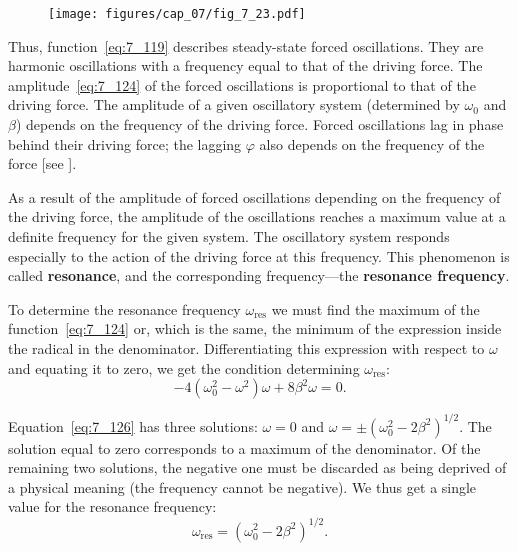 \begin{figure}[t]
	\begin{center}
		\texttt{[image: figures/cap\_07/fig\_7\_23.pdf]}
		\caption[]{}
		\label{fig:7_23}
	\end{center}
	\vspace{-0.8cm}
\end{figure}

Thus, function~\eqref{eq:7_119} describes steady-state forced oscillations. They are harmonic oscillations with a frequency equal to that of the driving force. The amplitude~\eqref{eq:7_124} of the forced oscillations is proportional to that of the driving force. The amplitude of a given oscillatory system (determined by $\omega_0$ and $\beta$) depends on the frequency of the driving force. Forced oscillations lag in phase behind their driving force; the lagging $\varphi$ also depends on the frequency of the force [see ].

As a result of the amplitude of forced oscillations depending on the frequency of the driving force, the amplitude of the oscillations reaches a maximum value at a definite frequency for the given system. The oscillatory system responds especially to the action of the driving force at this frequency. This phenomenon is called \textbf{resonance}, and the corresponding frequency---the \textbf{resonance frequency}.

To determine the resonance frequency $\omega_{\text{res}}$ we must find the maximum of the function~\eqref{eq:7_124} or, which is the same, the minimum of the expression inside the radical in the denominator. Differentiating this expression with respect to $\omega$ and equating it to zero, we get the condition determining $\omega_{\text{res}}$:
\begin{equation}\label{eq:7_126}
	-4\left(\omega_0^2 - \omega^2\right)\omega + 8\beta^2\omega = 0.
\end{equation}

Equation~\eqref{eq:7_126} has three solutions: $\omega=0$ and
$\omega=\pm\left(\omega_0^2-2\beta^2\right)^{1/2}$. The solution equal to zero corresponds to a maximum of the denominator. Of the remaining two solutions, the negative one must be discarded as being deprived of a physical meaning (the frequency cannot be negative). We thus get a single value for the resonance frequency:
\begin{equation}\label{eq:7_127}
	\omega_{\text{res}} = \left(\omega_0^2-2\beta^2\right)^{1/2}.
\end{equation}

